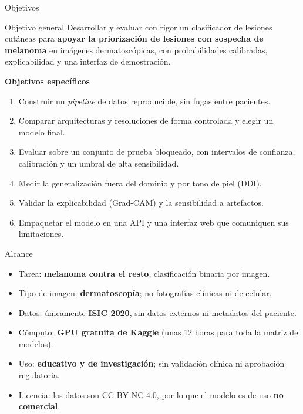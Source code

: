 \documentclass[aspectratio=169,10pt]{beamer}
\begin{document}
\begin{frame}{Objetivos}
  \begin{block}{Objetivo general}
    Desarrollar y evaluar con rigor un clasificador de lesiones cutáneas para \textbf{apoyar la priorización de lesiones con sospecha de melanoma} en imágenes dermatoscópicas, con probabilidades calibradas, explicabilidad y una interfaz de demostración.
  \end{block}
  \vspace{0.5em}
  \textbf{Objetivos específicos}
  \begin{enumerate}
    \item Construir un \textit{pipeline} de datos reproducible, sin fugas entre pacientes.
    \item Comparar arquitecturas y resoluciones de forma controlada y elegir un modelo final.
    \item Evaluar sobre un conjunto de prueba bloqueado, con intervalos de confianza, calibración y un umbral de alta sensibilidad.
    \item Medir la generalización fuera del dominio y por tono de piel (DDI).
    \item Validar la explicabilidad (Grad-CAM) y la sensibilidad a artefactos.
    \item Empaquetar el modelo en una API y una interfaz web que comuniquen sus limitaciones.
  \end{enumerate}
\end{frame}

\begin{frame}{Alcance}
  \begin{itemize}
    \item Tarea: \textbf{melanoma contra el resto}, clasificación binaria por imagen.
    \item Tipo de imagen: \textbf{dermatoscopía}; no fotografías clínicas ni de celular.
    \item Datos: únicamente \textbf{ISIC 2020}, sin datos externos ni metadatos del paciente.
    \item Cómputo: \textbf{GPU gratuita de Kaggle} (unas 12 horas para toda la matriz de modelos).
    \item Uso: \textbf{educativo y de investigación}; sin validación clínica ni aprobación regulatoria.
    \item Licencia: los datos son CC BY-NC 4.0, por lo que el modelo es de uso \textbf{no comercial}.
  \end{itemize}
\end{frame}
\end{document}
